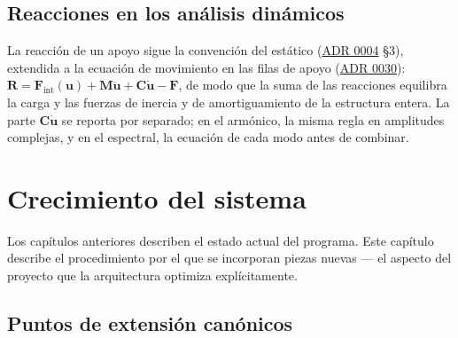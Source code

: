 \documentclass[11pt,oneside]{report}
\begin{document}
\section{Reacciones en los análisis dinámicos}

La reacción de un apoyo sigue la convención del estático (\hyperref[adr:0004]{ADR 0004} §3), extendida a la ecuación de movimiento en las filas de apoyo (\hyperref[adr:0030]{ADR 0030}): $\mathbf R = \mathbf F_\text{int}(\mathbf u) + \mathbf M\ddot{\mathbf u} + \mathbf C\dot{\mathbf u} - \mathbf F$, de modo que la suma de las reacciones equilibra la carga y las fuerzas de inercia y de amortiguamiento de la estructura entera. La parte $\mathbf C\dot{\mathbf u}$ se reporta por separado; en el armónico, la misma regla en amplitudes complejas, y en el espectral, la ecuación de cada modo antes de combinar.


\newpage

\chapter{Crecimiento del sistema}
\label{cap:7}



Los capítulos anteriores describen el estado actual del programa. Este capítulo describe el procedimiento por el que se incorporan piezas nuevas --- el aspecto del proyecto que la arquitectura optimiza explícitamente.

\section{Puntos de extensión canónicos}
\end{document}
